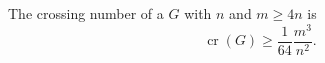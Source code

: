 \documentclass[12pt]{article}
\DeclareMathOperator{\crn}{cr}
\begin{document}
The crossing number of a  $G$ with $n$  and $m\geq 4n$  is
\begin{equation*}
\crn(G)\geq \frac{1}{64}\frac{m^3}{n^2}.
\end{equation*}
\end{document}
